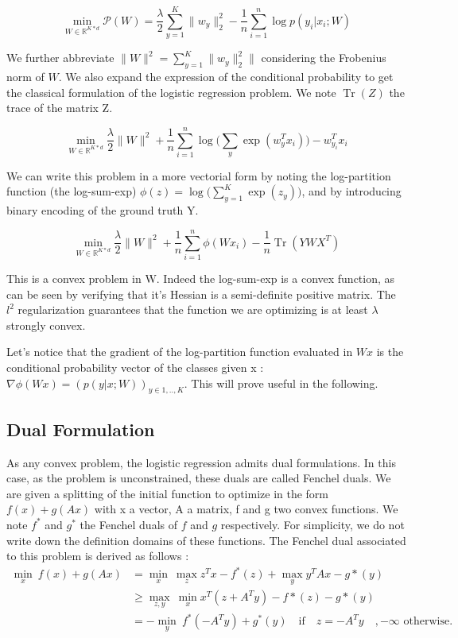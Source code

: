 \documentclass{article}
\DeclareMathOperator{\Tr}{Tr}
\begin{document}
 \begin{equation}
 	\min_{W \in \mathbb{R}^{K*d}} \mathscr{P}(W) = \frac{\lambda}{2}\sum_{y=1}^K  \|w_y\|_2^2 - \frac{1}{n} \sum_{i=1}^n \log p(y_i|x_i;W)
 \end{equation}
 
We further abbreviate $\|W\|^2 = \sum_{y=1}^K  \|w_y\|_2^2\|$ considering the Frobenius norm of $W$.
We also expand the expression of the conditional probability to get the classical formulation of the logistic regression problem.
We note $\Tr(Z)$ the trace of the matrix Z.

\begin{equation}
	\label{primal}
	\min_{W \in \mathbb{R}^{K*d}} \frac{\lambda}{2}\|W\|^2 + \frac{1}{n} \sum_{i=1}^n \log \bigg(\sum_y \exp(w_y^Tx_i)\bigg) - w_{y_i}^Tx_i 
\end{equation} 

We can write this problem in a more vectorial form by noting the log-partition function (the log-sum-exp) $\phi(z) = \log \big(\sum_{y=1}^K \exp(z_y)\big)$, and by introducing binary encoding of the ground truth Y. 

\begin{equation}
	\label{primal}
	\min_{W \in \mathbb{R}^{K*d}} \frac{\lambda}{2}\|W\|^2 + \frac{1}{n} \sum_{i=1}^n \phi(Wx_i) - \frac{1}{n}\Tr(Y W X^T) 
\end{equation} 

This is a convex problem in W.
Indeed the log-sum-exp is a convex function, as can be seen by verifying that it's Hessian is a semi-definite positive matrix.
The $l^2$ regularization guarantees that the function we are optimizing is at least $\lambda$ strongly convex. 

Let's notice that the gradient of the log-partition function evaluated in $Wx$ is the conditional probability vector of the classes given x : $\nabla\phi(Wx) = (p(y|x;W))_{y\in {1,..,K}}$.
This will prove useful in the following.

\subsection{Dual Formulation}

As any convex problem, the logistic regression admits dual formulations.
In this case, as the problem is unconstrained, these duals are called Fenchel duals.
We are given a splitting of the initial function to optimize in the form $f(x) + g(Ax)$ with x a vector, A a matrix, f and g two convex functions.
We note $f^*$ and $g^*$ the Fenchel duals of $f$ and $g$ respectively.
For simplicity, we do not write down the definition domains of these functions.
The Fenchel dual associated to this problem is derived as follows :
\begin{align*}
	 \min_x \ f(x) + g(Ax) & = \min_x \ \max_z z^Tx - f^*(z) + \max_y y^T A x - g*(y) \\
	 	& \geq \max_{z, y} \  \min_x x^T(z + A^T y) - f*(z) - g*(y) \\
		& =  - \min_y \   f^*(-A^Ty) + g^*(y) \quad \textrm{if} \quad z=-A^T y \quad , -\infty \textrm{ otherwise.}\\
\end{align*}
\end{document}
